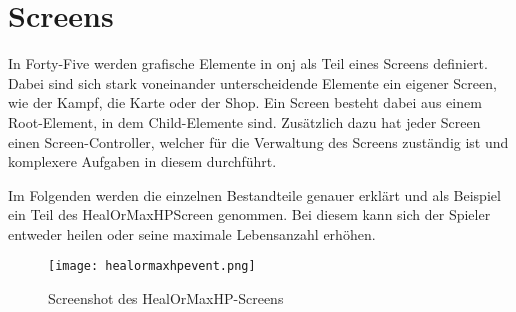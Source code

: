 \renewcommand{\kapitelautor}{Autor: Felix Zwickelstorfer}
\section{Screens}\label{sec:screens}
\renewcommand{\kapitelautor}{Autor: Felix Zwickelstorfer}
In Forty-Five werden grafische Elemente in onj als Teil eines Screens definiert.
Dabei sind sich stark voneinander unterscheidende Elemente ein eigener Screen, wie \zB der Kampf, die Karte oder der Shop.
Ein Screen besteht dabei aus einem Root-Element, in dem Child-Elemente sind.
Zusätzlich dazu hat jeder Screen einen Screen-Controller, welcher für die Verwaltung des Screens zuständig ist und komplexere Aufgaben in diesem durchführt.

Im Folgenden werden die einzelnen Bestandteile genauer erklärt und als Beispiel ein Teil des HealOrMaxHPScreen genommen.
Bei diesem kann sich der Spieler entweder heilen oder seine maximale Lebensanzahl erhöhen.
\begin{figure}[H]
    \centering
    \texttt{[image: healormaxhpevent.png]}
    \caption{Screenshot des HealOrMaxHP-Screens}
\end{figure}


